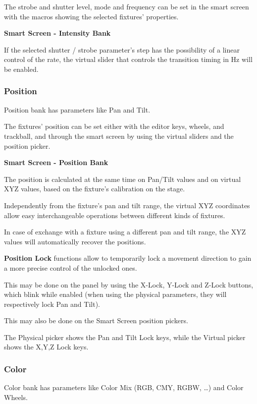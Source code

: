 \documentclass[
]{article}
\begin{document}
The strobe and shutter level, mode and frequency can be set in the smart screen with the macros showing the selected fixtures' properties.

\textbf{Smart Screen - Intensity Bank}

If the selected shutter / strobe parameter's step has the possibility of a linear control of the rate, the virtual slider that controls the transition timing in Hz will be enabled.

\hypertarget{position}{%
\subsubsection{Position}\label{position}}

Position bank has parameters like Pan and Tilt.

The fixtures' position can be set either with the editor keys, wheels, and trackball, and through the smart screen by using the virtual sliders and the position picker.

\textbf{Smart Screen - Position Bank}

The position is calculated at the same time on Pan/Tilt values and on virtual XYZ values, based on the fixture's calibration on the stage.

Independently from the fixture's pan and tilt range, the virtual XYZ coordinates allow easy interchangeable operations between different kinds of fixtures.

In case of exchange with a fixture using a different pan and tilt range, the XYZ values will automatically recover the positions.

\textbf{Position Lock} functions allow to temporarily lock a movement direction to gain a more precise control of the unlocked ones.

This may be done on the panel by using the X-Lock, Y-Lock and Z-Lock buttons, which blink while enabled (when using the physical parameters, they will respectively lock Pan and Tilt).

This may also be done on the Smart Screen position pickers.

The Physical picker shows the Pan and Tilt Lock keys, while the Virtual picker shows the X,Y,Z Lock keys.

\hypertarget{color}{%
\subsubsection{Color}\label{color}}

Color bank has parameters like Color Mix (RGB, CMY, RGBW, \ldots) and Color Wheels.
\end{document}
